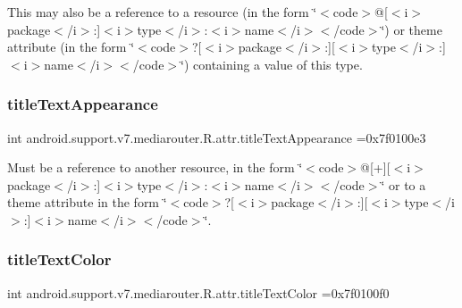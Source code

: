 This may also be a reference to a resource (in the form \char`\"{}$<$code$>$@\mbox{[}$<$i$>$package$<$/i$>$\+:\mbox{]}$<$i$>$type$<$/i$>$\+:$<$i$>$name$<$/i$>$$<$/code$>$\char`\"{}) or theme attribute (in the form \char`\"{}$<$code$>$?\mbox{[}$<$i$>$package$<$/i$>$\+:\mbox{]}\mbox{[}$<$i$>$type$<$/i$>$\+:\mbox{]}$<$i$>$name$<$/i$>$$<$/code$>$\char`\"{}) containing a value of this type. \mbox{\label{classandroid_1_1support_1_1v7_1_1mediarouter_1_1R_1_1attr_a4829358bbcfaace73a8abe57ee662d20}} 
\subsubsection{\texorpdfstring{title\+Text\+Appearance}{titleTextAppearance}}
{\footnotesize\ttfamily int android.\+support.\+v7.\+mediarouter.\+R.\+attr.\+title\+Text\+Appearance =0x7f0100e3\hspace{0.3cm}{\ttfamily [static]}}

Must be a reference to another resource, in the form \char`\"{}$<$code$>$@\mbox{[}+\mbox{]}\mbox{[}$<$i$>$package$<$/i$>$\+:\mbox{]}$<$i$>$type$<$/i$>$\+:$<$i$>$name$<$/i$>$$<$/code$>$\char`\"{} or to a theme attribute in the form \char`\"{}$<$code$>$?\mbox{[}$<$i$>$package$<$/i$>$\+:\mbox{]}\mbox{[}$<$i$>$type$<$/i$>$\+:\mbox{]}$<$i$>$name$<$/i$>$$<$/code$>$\char`\"{}. \mbox{\label{classandroid_1_1support_1_1v7_1_1mediarouter_1_1R_1_1attr_ac6dbb1219e8f190a50d809cb15b2c6cf}} 
\subsubsection{\texorpdfstring{title\+Text\+Color}{titleTextColor}}
{\footnotesize\ttfamily int android.\+support.\+v7.\+mediarouter.\+R.\+attr.\+title\+Text\+Color =0x7f0100f0\hspace{0.3cm}{\ttfamily [static]}}

